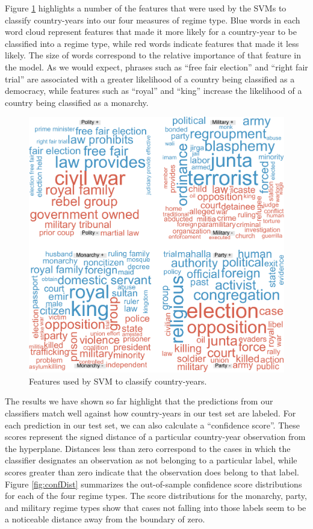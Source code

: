 \documentclass[pdftex,12pt,fullpage,oneside]{amsart}
\begin{document}
Figure \ref{fig:wrdCloud} highlights a number of the features that were used by the SVMs to classify country-years into our four measures of regime type. Blue words in each word cloud represent features that made it more likely for a country-year to be classified into a regime type, while red words indicate features that made it less likely. The size of words correspond to the relative importance of that feature in the model. As we would expect, phrases such as ``free fair election'' and ``right fair trial'' are associated with a greater likelihood of a country being classified as a democracy, while features such as ``royal'' and ``king'' increase the likelihood of a country being classified as a monarchy. 

\begin{figure}[ht]
	\centering
	\includegraphics[width=.7\textwidth]{pol_bin_wrdCloud}
	\caption{Features used by SVM to classify country-years.}
	\label{fig:wrdCloud}
\end{figure}
\FloatBarrier

The results we have shown so far highlight that the predictions from our classifiers match well against how country-years in our test set are labeled. For each prediction in our test set, we can also calculate a ``confidence score''. These scores represent the signed distance of a particular country-year observation from the hyperplane. Distances less than zero correspond to the cases in which the classifier designates an observation as not belonging to a particular label, while scores greater than zero indicate that the observation does belong to that label. Figure \ref{fig:confDist} summarizes the out-of-sample confidence score distributions for each of the four regime types. The score distributions for the monarchy, party, and military regime types show that cases not falling into those labels seem to be a noticeable distance away from the boundary of zero. 
\end{document}
